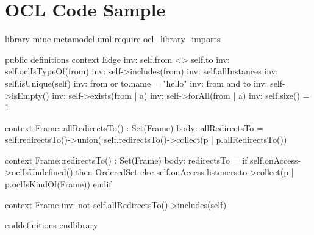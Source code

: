 \chapter{OCL Code Sample}

\begin{oclcode}
library mine
  metamodel uml
  require ocl_library_imports
  
  public definitions
  context Edge
    inv: self.from <> self.to
    inv: self.oclIsTypeOf(from)
    inv: self->includes(from)
    inv: self.allInstances
    inv: self.isUnique(self)
    inv: from or to.name = "hello"
    inv: from and to
    inv: self->isEmpty()
    inv: self->exists(from | a)
    inv: self->forAll(from | a)
    inv: self.size() = 1

  context Frame::allRedirectsTo() : Set(Frame) body: 
    allRedirectsTo = self.redirectsTo()->union(
      self.redirectsTo()->collect(p | p.allRedirectsTo())

  context Frame::redirectsTo() : Set(Frame) body: 
    redirectsTo = if self.onAccess->oclIsUndefined() then OrderedSet{}
      else self.onAccess.listeners.to->collect(p | p.oclIsKindOf(Frame))
      endif

  context Frame inv:
    not self.allRedirectsTo()->includes(self)
  
  enddefinitions
endlibrary
\end{oclcode}
